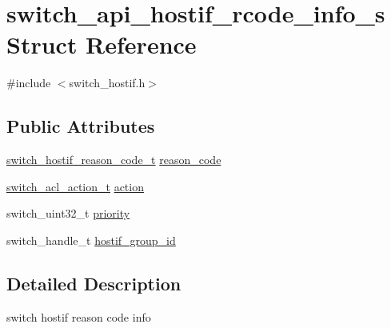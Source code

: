 \hypertarget{structswitch__api__hostif__rcode__info__s}{\section{switch\+\_\+api\+\_\+hostif\+\_\+rcode\+\_\+info\+\_\+s Struct Reference}
\label{structswitch__api__hostif__rcode__info__s}
}


{\ttfamily \#include $<$switch\+\_\+hostif.\+h$>$}

\subsection*{Public Attributes}
\begin{DoxyCompactItemize}
\item 
\hyperlink{group__HostInterface_gab8b13524888d4f506357fae04c44babc}{switch\+\_\+hostif\+\_\+reason\+\_\+code\+\_\+t} \hyperlink{structswitch__api__hostif__rcode__info__s_a44c2a1b2bfb2f72f409055ee01e3fcf8}{reason\+\_\+code}
\item 
\hyperlink{group__ACL_ga9e512fe793010aac7829bb2fbef4764d}{switch\+\_\+acl\+\_\+action\+\_\+t} \hyperlink{structswitch__api__hostif__rcode__info__s_a3fe5e9ebb0f986a2628a16238c7184d9}{action}
\item 
switch\+\_\+uint32\+\_\+t \hyperlink{structswitch__api__hostif__rcode__info__s_a2b84ac51c230dd6b0d59714915a52bf6}{priority}
\item 
switch\+\_\+handle\+\_\+t \hyperlink{structswitch__api__hostif__rcode__info__s_ab1cdb2c88a3b8aa897a79017372c907a}{hostif\+\_\+group\+\_\+id}
\end{DoxyCompactItemize}


\subsection{Detailed Description}
switch hostif reason code info 

